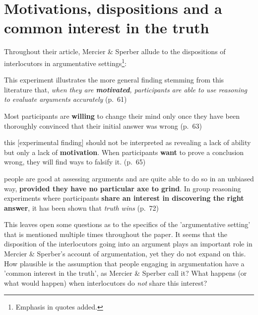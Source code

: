 \section{Motivations, dispositions and a common interest in the truth}

Throughout their \citeyear{MS11} article, Mercier \& Sperber allude to the dispositions
of interlocutors in argumentative settings\footnote{Emphasis in quotes added.}:
\begin{quoting}
    This experiment illustrates the more general finding stemming from this literature that, \emph{when they are \textbf{motivated}, participants are able to use reasoning to evaluate arguments accurately}
    \hfill (p.~61)
\end{quoting}
\begin{quoting}
    Most participants are \textbf{willing} to change their mind only once they have been thoroughly convinced that their initial answer was wrong
    \hfill (p.~63)
\end{quoting}
\begin{quoting}
    this [experimental finding] should not be interpreted as revealing a lack of ability but only a lack of \textbf{motivation}. When participants \textbf{want} to prove a conclusion wrong, they will find ways to falsify it.
    \hfill (p.~65)
\end{quoting}
\begin{quoting}
    people are good at assessing arguments and are quite able to do so in an unbiased way, \textbf{provided they have no particular axe to grind}. In group reasoning experiments where participants \textbf{share an interest in discovering the right answer}, it has been shown that \emph{truth wins}
    \hfill (p.~72)
\end{quoting}
This leaves open some questions as to the specifics of the 'argumentative setting' that is mentioned multiple times throughout the paper. It seems that the disposition of the interlocutors going into an argument plays an important role in Mercier \& Sperber's account of argumentation, yet they do not expand on this.
How plausible is the assumption that people engaging in argumentation have a 'common interest in the truth', as Mercier \& Sperber call it? What happens (or what would happen) when interlocutors do \emph{not} share this interest?

